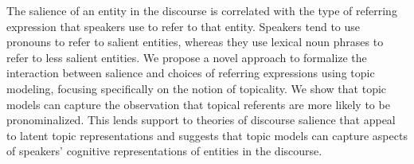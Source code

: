 The salience of an entity in the discourse is correlated with the type of referring expression that speakers use to refer to that entity. Speakers tend to use pronouns to refer to salient entities, whereas they use lexical noun phrases to refer to less salient entities. We propose a novel approach to formalize the interaction between salience and choices of referring expressions using topic modeling, focusing specifically on the notion of topicality. We show that topic models can capture the observation that topical referents are more likely to be pronominalized. This lends support to theories of discourse salience that appeal to latent topic representations and suggests that topic models can capture aspects of speakers' cognitive representations of entities in the discourse.
